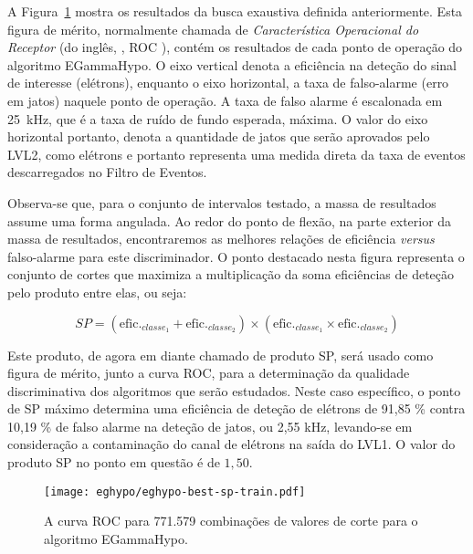 A Figura~\ref{fig:eghypo-best-sp-train} mostra os resultados da busca
exaustiva definida anteriormente. Esta figura de mérito, normalmente
chamada de \textit{Característica Operacional do Receptor} (do inglês,
, ROC \cite{vantrees}), contém os
resultados de cada ponto de operação do algoritmo EGammaHypo. O eixo vertical
denota a eficiência na deteção do sinal de interesse (elétrons), enquanto o
eixo horizontal, a taxa de falso-alarme (erro em jatos) naquele ponto de
operação. A taxa de falso alarme é escalonada em 25~kHz, que é a taxa de ruído
de fundo esperada, máxima. O valor do eixo horizontal portanto, denota a
quantidade de jatos que serão aprovados pelo LVL2, como elétrons e portanto
representa uma medida direta da taxa de eventos descarregados no Filtro de
Eventos.

Observa-se que, para o conjunto de intervalos testado, a massa de resultados
assume uma forma angulada. Ao redor do ponto de flexão, na parte exterior da
massa de resultados, encontraremos as melhores relações de eficiência
\textit{versus} falso-alarme para este discriminador. O ponto destacado nesta
figura representa o conjunto de cortes que maximiza a multiplicação da soma
eficiências de deteção pelo produto entre elas, ou seja:

\begin{equation}
SP = (\text{efic.}_{classe_1} + \text{efic.}_{classe_2}) \times (\text{efic.}_{classe_1} \times \text{efic.}_{classe_2})
\end{equation}

Este produto, de agora em diante chamado de produto SP, será usado como figura
de mérito, junto a curva ROC, para a determinação da qualidade discriminativa
dos algoritmos que serão estudados. Neste caso específico, o ponto de SP
máximo determina uma eficiência de deteção de elétrons de 91,85 \% contra
10,19 \% de falso alarme na deteção de jatos, ou 2,55 kHz, levando-se em
consideração a contaminação do canal de elétrons na saída do LVL1. O valor do
produto SP no ponto em questão é de $1,50$.

\begin{figure}
\begin{center}
\texttt{[image: eghypo/eghypo-best-sp-train.pdf]}
\end{center}
\caption{A curva ROC para 771.579 combinações de valores de corte para o
algoritmo EGammaHypo.}
\label{fig:eghypo-best-sp-train}
\end{figure}

